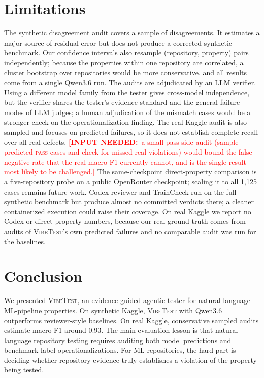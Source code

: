 \documentclass[11pt]{article}
\DeclareRobustCommand{\needsinput}[1]{\textcolor{red}{\textbf{[INPUT NEEDED:}~#1\textbf{]}}}
\newcommand{\pass}{\textsc{pass}}
\newcommand{\vibetest}{\textsc{VibeTest}}
\newcommand{\qwen}{Qwen3.6}
\begin{document}
\section{Limitations}
\label{sec:limitations}

The synthetic disagreement audit covers a sample of disagreements.
It estimates a major source of residual error but does not produce a corrected
synthetic benchmark.
Our confidence intervals also resample (repository, property) pairs
independently; because the properties within one repository are correlated, a
cluster bootstrap over repositories would be more conservative, and all results
come from a single \qwen{} run.
The audits are adjudicated by an LLM verifier.
Using a different model family from the tester gives cross-model independence,
but the verifier shares the tester's evidence standard and the general failure
modes of LLM judges; a human adjudication of the mismatch cases would be a
stronger check on the operationalization finding.
The real Kaggle audit is also sampled and focuses on predicted failures, so it
does not establish complete recall over all real defects.
\needsinput{a small pass-side audit (sample predicted \pass{} cases and check
for missed real violations) would bound the false-negative rate that the real
macro F1 currently cannot, and is the single result most likely to be
challenged.}
The same-checkpoint direct-property comparison is a five-repository probe on a
public OpenRouter checkpoint; scaling it to all 1{,}125 cases remains future
work.
Codex reviewer and TrainCheck run on the full synthetic benchmark but produce
almost no committed verdicts there; a cleaner containerized execution could
raise their coverage.
On real Kaggle we report no Codex or direct-property numbers, because our real
ground truth comes from audits of \vibetest{}'s own predicted failures and no
comparable audit was run for the baselines.

\section{Conclusion}

We presented \vibetest, an evidence-guided agentic tester for natural-language
ML-pipeline properties.
On synthetic Kaggle, \vibetest{} with \qwen{} outperforms reviewer-style
baselines.
On real Kaggle, conservative sampled audits estimate macro F1 around 0.93.
The main evaluation lesson is that natural-language repository testing requires
auditing both model predictions and benchmark-label operationalizations.
For ML repositories, the hard part is deciding whether repository evidence
truly establishes a violation of the property being tested.
\end{document}
